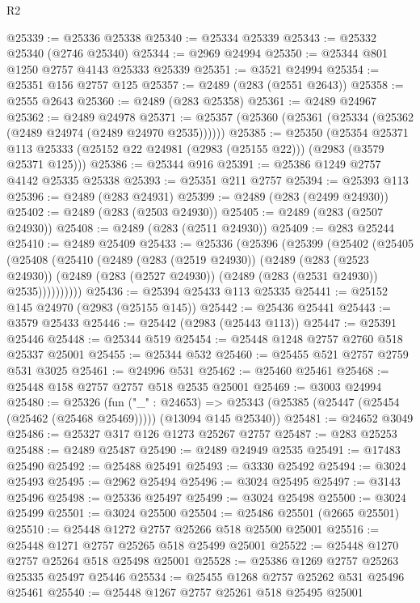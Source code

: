 \begin{lexlean}{R2}
\begin{coremodule}
@25339 := @25336 @25338
@25340 := @25334 @25339
@25343 := @25332 @25340 (@2746 @25340)
@25344 := @2969 @24994
@25350 := @25344 @801 @1250 @2757 @4143 @25333 @25339
@25351 := @3521 @24994
@25354 := @25351 @156 @2757 @125
@25357 := @2489 (@283 (@2551 @2643))
@25358 := @2555 @2643
@25360 := @2489 (@283 @25358)
@25361 := @2489 @24967
@25362 := @2489 @24978
@25371 := @25357 (@25360 (@25361 (@25334 (@25362 (@2489 @24974 (@2489 @24970 @2535))))))
@25385 := @25350
    (@25354 @25371 @113 @25333 (@25152 @22 @24981 (@2983 (@25155 @22))) (@2983 (@3579 @25371 @125)))
@25386 := @25344 @916
@25391 := @25386 @1249 @2757 @4142 @25335 @25338
@25393 := @25351 @211 @2757
@25394 := @25393 @113
@25396 := @2489 (@283 @24931)
@25399 := @2489 (@283 (@2499 @24930))
@25402 := @2489 (@283 (@2503 @24930))
@25405 := @2489 (@283 (@2507 @24930))
@25408 := @2489 (@283 (@2511 @24930))
@25409 := @283 @25244
@25410 := @2489 @25409
@25433 := @25336
    (@25396
      (@25399
        (@25402
          (@25405
            (@25408
              (@25410
                (@2489
                  (@283 (@2519 @24930))
                  (@2489
                    (@283 (@2523 @24930))
                    (@2489 (@283 (@2527 @24930)) (@2489 (@283 (@2531 @24930)) @2535))))))))))
@25436 := @25394 @25433 @113 @25335
@25441 := @25152 @145 @24970 (@2983 (@25155 @145))
@25442 := @25436 @25441
@25443 := @3579 @25433
@25446 := @25442 (@2983 (@25443 @113))
@25447 := @25391 @25446
@25448 := @25344 @519
@25454 := @25448 @1248 @2757 @2760 @518 @25337 @25001
@25455 := @25344 @532
@25460 := @25455 @521 @2757 @2759 @531 @3025
@25461 := @24996 @531
@25462 := @25460 @25461
@25468 := @25448 @158 @2757 @2757 @518 @2535 @25001
@25469 := @3003 @24994
@25480 := @25326
    (fun ("_" : @24653) =>
    @25343 (@25385 (@25447 (@25454 (@25462 (@25468 @25469))))) (@13094 @145 @25340))
@25481 := @24652 @3049
@25486 := @25327 @317 @126 @1273 @25267 @2757
@25487 := @283 @25253
@25488 := @2489 @25487
@25490 := @2489 @24949 @2535
@25491 := @17483 @25490
@25492 := @25488 @25491
@25493 := @3330 @25492
@25494 := @3024 @25493
@25495 := @2962 @25494
@25496 := @3024 @25495
@25497 := @3143 @25496
@25498 := @25336 @25497
@25499 := @3024 @25498
@25500 := @3024 @25499
@25501 := @3024 @25500
@25504 := @25486 @25501 (@2665 @25501)
@25510 := @25448 @1272 @2757 @25266 @518 @25500 @25001
@25516 := @25448 @1271 @2757 @25265 @518 @25499 @25001
@25522 := @25448 @1270 @2757 @25264 @518 @25498 @25001
@25528 := @25386 @1269 @2757 @25263 @25335 @25497 @25446
@25534 := @25455 @1268 @2757 @25262 @531 @25496 @25461
@25540 := @25448 @1267 @2757 @25261 @518 @25495 @25001

\end{coremodule}
\end{lexlean}
